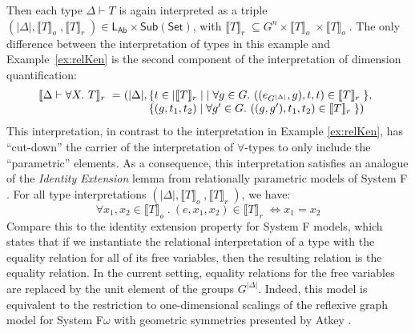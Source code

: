 \documentclass[a4paper,UKenglish]{lipics}
\newcommand{\msf}[1]{\mathsf{#1}} %
\newcommand{\Set}{\msf{Set}}
\newcommand{\Sub}[1]{\msf{Sub}(#1)}
\newcommand{\LAb}{\msf{L}_{\msf{Ab}}}
\newcommand{\semo}[1]{\ensuremath{\llbracket #1 \rrbracket _o} \;}
\newcommand{\semr}[1]{\ensuremath{\llbracket #1 \rrbracket _r} \;}
\begin{document}
\begin{example}
  Then each type $\Delta \vdash T$ is again interpreted as a triple
  $(|\Delta|, \semo{T}, \semr{T}) \in \LAb \times \Sub{\Set}$, with
  $\semr{T} \subseteq G^n \times \semo{T} \times \semo{T}$. The only
  difference between the interpretation of types in this example and
  Example~\ref{ex:relKen} is the second component of the
  interpretation of dimension quantification:
  \begin{displaymath}
    \begin{array}{l@{\hspace{0.3em}}c@{\hspace{0.3em}}l}
      \semr{\Delta \vdash \forall X.~T} & = & (|\Delta|,
      \begin{array}[t]{@{}l}
        \{ t \in |\semr{T}| \mathrel| \forall g \in G.~((e_{G^{|\Delta|}},g), t, t) \in \semr{T} \},\\
        \{ (g, t_1, t_2) \mathrel| \forall g' \in G.~((g,g'), t_1, t_2) \in \semr{T} \} )
      \end{array}
    \end{array}
  \end{displaymath}
  This interpretation, in contrast to the interpretation in Example
  \ref{ex:relKen}, has ``cut-down'' the carrier of the interpretation
  of $\forall$-types to only include the ``parametric'' elements. As a
  consequence, this interpretation satisfies an analogue of the
  \emph{Identity Extension} lemma from relationally parametric models
  of System F \cite{reynolds1983types}. For all type interpretations
  $(|\Delta|, \semo{T}, \semr{T})$, we have:
  \begin{displaymath}
    \forall x_1, x_2 \in \semo{T}.~(e,x_1,x_2) \in \semr{T} \Leftrightarrow x_1 = x_2
  \end{displaymath}
  Compare this to the identity extension property for System F models,
  which states that if we instantiate the relational interpretation of
  a type with the equality relation for all of its free variables,
  then the resulting relation is the equality relation. In the current
  setting, equality relations for the free variables are replaced by
  the unit element of the groups $G^{|\Delta|}$. Indeed, this model is
  equivalent to the restriction to one-dimensional scalings of the
  reflexive graph model for System F$\omega$ with geometric symmetries
  presented by Atkey \cite{atkey14conservation}.
\end{example}
\end{document}
